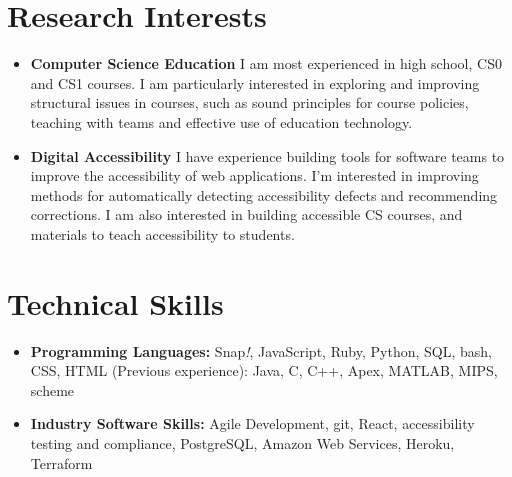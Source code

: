 \section{Research Interests}

\vspace{6pt}
\begin{itemize}

  \setlength\itemsep{1em}

    \item \textbf{Computer Science Education}
    \newline
    \small I am most experienced in high school, CS0 and CS1 courses. I am particularly interested in exploring and improving structural issues in courses, such as sound principles for course policies, teaching with teams and effective use of education technology.
    
    \item \textbf{Digital Accessibility}
    \newline
    \small I have experience building tools for software teams to improve the accessibility of web applications. I'm interested in improving methods for automatically detecting accessibility defects and recommending corrections. I am also interested in building accessible CS courses, and materials to teach accessibility to students.

\end{itemize}

\section{Technical Skills}

\vspace{6pt}

\begin{itemize}

  \setlength\itemsep{1em}

    \item \textbf{Programming Languages:}
    \newline
    Snap\textit{!}, JavaScript, Ruby, Python, SQL, bash, CSS, HTML
    \newline
    \small (Previous experience): Java, C, C++, Apex, MATLAB, MIPS, scheme
    \vspace{6pt}
    
    \item \textbf{Industry Software Skills:}
    \newline
    Agile Development, git, React, accessibility testing and compliance, PostgreSQL, Amazon Web Services, Heroku, Terraform


\end{itemize}

